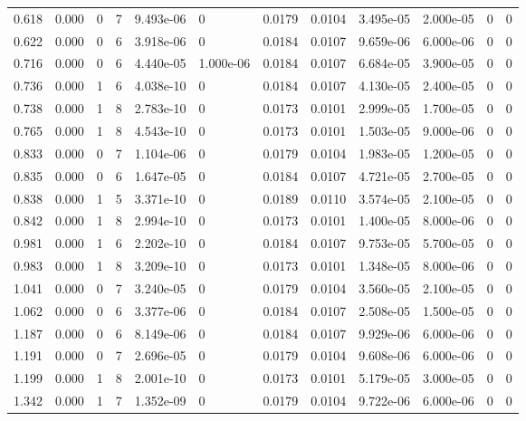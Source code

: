 \documentclass[preview]{standalone}
\begin{document}
{{\begin{tabular}{L{1.2cm}C{1.2cm} C{0.3cm}C{0.5cm} C{1.4cm}C{1.4cm} C{1.4cm}C{1.4cm} C{1.6cm}C{1.6cm} C{1.6cm}C{1.6cm}}
  0.618  &  0.000  & 0     &  7 &  9.493e-06  & 0  &  0.0179&   0.0104& 3.495e-05 & 2.000e-05   &  0 & 0  \\ 
  0.622  &  0.000  & 0     &  6 &  3.918e-06  & 0  &  0.0184&   0.0107& 9.659e-06 & 6.000e-06   &  0 & 0  \\ 
  0.716  &  0.000  & 0     &  6 &  4.440e-05  & 1.000e-06  &  0.0184&   0.0107& 6.684e-05 & 3.900e-05   &  0 & 0  \\ 
  0.736  &  0.000  & 1     &  6 &  4.038e-10  & 0  &  0.0184&   0.0107& 4.130e-05 & 2.400e-05   &  0 & 0  \\ 
  0.738  &  0.000  & 1     &  8 &  2.783e-10  & 0  &  0.0173&   0.0101& 2.999e-05 & 1.700e-05   &  0 & 0  \\ 
  0.765  &  0.000  & 1     &  8 &  4.543e-10  & 0  &  0.0173&   0.0101& 1.503e-05 & 9.000e-06   &  0 & 0  \\ 
  0.833  &  0.000  & 0     &  7 &  1.104e-06  & 0  &  0.0179&   0.0104& 1.983e-05 & 1.200e-05   &  0 & 0  \\ 
  0.835  &  0.000  & 0     &  6 &  1.647e-05  & 0  &  0.0184&   0.0107& 4.721e-05 & 2.700e-05   &  0 & 0  \\ 
  0.838  &  0.000  & 1     &  5 &  3.371e-10  & 0  &  0.0189&   0.0110& 3.574e-05 & 2.100e-05   &  0 & 0  \\ 
  0.842  &  0.000  & 1     &  8 &  2.994e-10  & 0  &  0.0173&   0.0101& 1.400e-05 & 8.000e-06   &  0 & 0  \\ 
  0.981  &  0.000  & 1     &  6 &  2.202e-10  & 0  &  0.0184&   0.0107& 9.753e-05 & 5.700e-05   &  0 & 0  \\ 
  0.983  &  0.000  & 1     &  8 &  3.209e-10  & 0  &  0.0173&   0.0101& 1.348e-05 & 8.000e-06   &  0 & 0  \\ 
  1.041  &  0.000  & 0     &  7 &  3.240e-05  & 0  &  0.0179&   0.0104& 3.560e-05 & 2.100e-05   &  0 & 0  \\ 
  1.062  &  0.000  & 0     &  6 &  3.377e-06  & 0  &  0.0184&   0.0107& 2.508e-05 & 1.500e-05   &  0 & 0  \\ 
  1.187  &  0.000  & 0     &  6 &  8.149e-06  & 0  &  0.0184&   0.0107& 9.929e-06 & 6.000e-06   &  0 & 0  \\ 
  1.191  &  0.000  & 0     &  7 &  2.696e-05  & 0  &  0.0179&   0.0104& 9.608e-06 & 6.000e-06   &  0 & 0  \\ 
  1.199  &  0.000  & 1     &  8 &  2.001e-10  & 0  &  0.0173&   0.0101& 5.179e-05 & 3.000e-05   &  0 & 0  \\ 
  1.342  &  0.000  & 1     &  7 &  1.352e-09  & 0  &  0.0179&   0.0104& 9.722e-06 & 6.000e-06   &  0 & 0  \\ 

\end{tabular}}}
\end{document}
